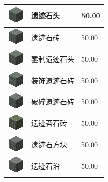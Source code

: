 \documentclass[UTF8]{ctexart}
\begin{document}
\begin{longtable}[]{|p{1cm}|p{8cm}|p{1.5cm}|}
	\hline
	\includegraphics{.workspace/icons/twilightforest/twilightforest__maze_stone__0.png} & 遗迹石头 &50.00\\
	\hline
	\includegraphics{.workspace/icons/twilightforest/twilightforest__maze_stone__1.png} & 遗迹石砖 &50.00\\
	\hline
	\includegraphics{.workspace/icons/twilightforest/twilightforest__maze_stone__2.png} & 錾制遗迹石头 &50.00\\
	\hline
	\includegraphics{.workspace/icons/twilightforest/twilightforest__maze_stone__3.png} & 装饰遗迹石砖 &50.00\\
	\hline
	\includegraphics{.workspace/icons/twilightforest/twilightforest__maze_stone__4.png} & 破碎遗迹石砖 &50.00\\
	\hline
	\includegraphics{.workspace/icons/twilightforest/twilightforest__maze_stone__5.png} & 遗迹苔石砖 &50.00\\
	\hline
	\includegraphics{.workspace/icons/twilightforest/twilightforest__maze_stone__6.png} & 遗迹石方块 &50.00\\
	\hline
	\includegraphics{.workspace/icons/twilightforest/twilightforest__maze_stone__7.png} & 遗迹石沿 &50.00\\
	\hline

\end{longtable}
\end{document}
